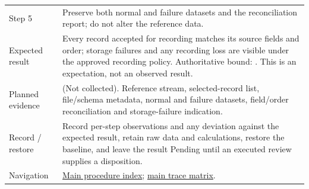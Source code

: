 \begin{tabularx}{\linewidth}{L{3.2cm}Y}
Step 5 & Preserve both normal and failure datasets and the reconciliation report; do not alter the reference data.\\
Expected result & Every record accepted for recording matches its source fields and order; storage failures and any recording loss are visible under the approved recording policy. Authoritative bound: . This is an expectation, not an observed result.\\
Planned evidence &  (Not collected). Reference stream, selected-record list, file/schema metadata, normal and failure datasets, field/order reconciliation and storage-failure indication.\\
Record / restore & Record per-step observations and any deviation against the expected result, retain raw data and calculations, restore the baseline, and leave the result Pending until an executed review supplies a disposition.\\
Navigation & \hyperref[Table:WeekTwoTests]{Main procedure index}; \hyperref[Table:TraceabilityMatrix]{main trace matrix}.\\
\end{tabularx}
\normalsize
